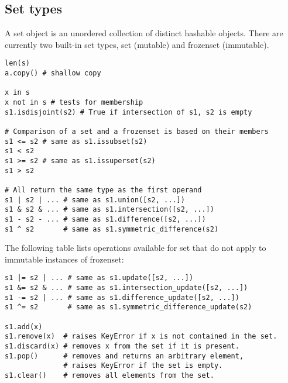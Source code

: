 %

\subsection{Set types}
A set object is an unordered collection of distinct hashable objects. 
There are currently two built-in set types, set (mutable) and frozenset (immutable).

\begin{verbatim}
len(s)
a.copy() # shallow copy

x in s
x not in s # tests for membership
s1.isdisjoint(s2) # True if intersection of s1, s2 is empty

# Comparison of a set and a frozenset is based on their members
s1 <= s2 # same as s1.issubset(s2)
s1 < s2
s1 >= s2 # same as s1.issuperset(s2)
s1 > s2

# All return the same type as the first operand
s1 | s2 | ... # same as s1.union([s2, ...])
s1 & s2 & ... # same as s1.intersection([s2, ...])
s1 - s2 - ... # same as s1.difference([s2, ...])
s1 ^ s2       # same as s1.symmetric_difference(s2)
\end{verbatim}

The following table lists operations available for set that do not apply to immutable instances of frozenset:
\begin{verbatim}
s1 |= s2 | ... # same as s1.update([s2, ...])
s1 &= s2 & ... # same as s1.intersection_update([s2, ...])
s1 -= s2 | ... # same as s1.difference_update([s2, ...])
s1 ^= s2       # same as s1.symmetric_difference_update(s2)

s1.add(x)
s1.remove(x)  # raises KeyError if x is not contained in the set.
s1.discard(x) # removes x from the set if it is present.
s1.pop()      # removes and returns an arbitrary element,
              # raises KeyError if the set is empty.
s1.clear()    # removes all elements from the set.
\end{verbatim}
%